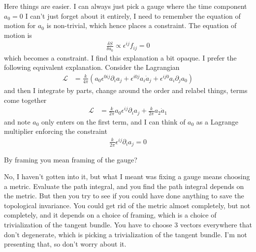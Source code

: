 Here things are easier.
I can always just pick a gauge where the time component $a_0=0$
I can't just forget about it entirely,
I need to remember the equation of motion for $a_0$ is non-trivial,
which hence places a constraint.
The equation of motion is
\begin{align}
    \frac{\delta S}{\delta a_0}
    \propto
    \epsilon^{ij}f_{ij} = 0
\end{align}
which becomes a constraint.
I find this explanation a bit opaque.
I prefer the following equivalent explanation.
Consider the Lagrangian
\begin{align}
    \mathcal{L}
    &=
    \frac{k}{4\pi}\left( 
    a_0 \epsilon^{0ij} \partial_i a_j
    +
    \epsilon^{i0j} a_i \dot{a}_j
    +
    \epsilon^{ij0} a_i \partial_j a_0
    \right)
\end{align}
and then I integrate by parts,
change around the order and relabel things,
terms come together
\begin{align}
    \mathcal{L} &=
    \frac{k}{2\pi}
    a_0 \epsilon^{ij} \partial_i a_j
    +
    \frac{k}{2\pi}
    a_2 \dot{a}_1
\end{align}
and note $a_0$ only enters on the first term,
and I can think of $a_0$ as a Lagrange multiplier
enforcing the constraint
\begin{align}
    \frac{k}{2\pi}\epsilon^{ij} \partial_i a_j = 0
\end{align}

\begin{question}
    By framing you mean framing of the gauge?
\end{question}
No, I haven't gotten into it,
but what I meant was fixing a gauge means choosing a metric.
Evaluate the path integral,
and you find the path integral depends on the metric.
But then you try to see if you could have done anything to save the topological
invariance.
You could get rid of the metric almost completely,
but not completely,
and it depends on a choice of framing,
which is a choice of trivialization of the tangent bundle.
You have to choose 3 vectors everywhere that don't degenerate,
which is picking a trivialization of the tangent bundle.
I'm not presenting that, so don't worry about it.


